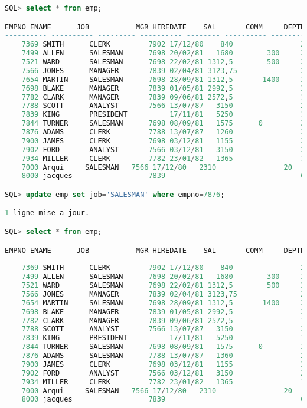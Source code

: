 \documentclass{article}
\begin{document}
\begin{lstlisting}[language=SQL,
    deletekeywords={char},
    morekeywords={DECLARE, LOOP, TYPE, FOR, IF, IS, OPEN, FETCH, DBMS_OUTPUT, PUT_LINE}]
SQL> select * from emp;

EMPNO ENAME      JOB	       MGR HIREDATE	   SAL	     COMM     DEPTNO
---------- ---------- --------- ---------- -------- ---------- ---------- ----------
    7369 SMITH      CLERK	      7902 17/12/80	   840			      20
    7499 ALLEN      SALESMAN	  7698 20/02/81	  1680	      300	  30
    7521 WARD       SALESMAN	  7698 22/02/81	1312,5	      500	  30
    7566 JONES      MANAGER	      7839 02/04/81 3123,75			      20
    7654 MARTIN     SALESMAN	  7698 28/09/81	1312,5	     1400	  30
    7698 BLAKE      MANAGER	      7839 01/05/81	2992,5			      30
    7782 CLARK      MANAGER	      7839 09/06/81	2572,5			      10
    7788 SCOTT      ANALYST	      7566 13/07/87	  3150			      20
    7839 KING       PRESIDENT 	       17/11/81	  5250			      10
    7844 TURNER     SALESMAN	  7698 08/09/81	  1575		0	      30
    7876 ADAMS      CLERK	      7788 13/07/87	  1260			      20
    7900 JAMES      CLERK	      7698 03/12/81	  1155			      30
    7902 FORD       ANALYST	      7566 03/12/81	  3150			      20
    7934 MILLER     CLERK	      7782 23/01/82	  1365			      10
    7000 Arqui     SALESMAN	  7566 17/12/80	  2310			      20
    8000 jacques		          7839					              64

SQL> update emp set job='SALESMAN' where empno=7876;

1 ligne mise a jour.

SQL> select * from emp;

EMPNO ENAME      JOB	       MGR HIREDATE	   SAL	     COMM     DEPTNO
---------- ---------- --------- ---------- -------- ---------- ---------- ----------
    7369 SMITH      CLERK	      7902 17/12/80	   840			      20
    7499 ALLEN      SALESMAN	  7698 20/02/81	  1680	      300	  30
    7521 WARD       SALESMAN	  7698 22/02/81	1312,5	      500	  30
    7566 JONES      MANAGER	      7839 02/04/81 3123,75			      20
    7654 MARTIN     SALESMAN	  7698 28/09/81	1312,5	     1400	  30
    7698 BLAKE      MANAGER	      7839 01/05/81	2992,5			      30
    7782 CLARK      MANAGER	      7839 09/06/81	2572,5			      10
    7788 SCOTT      ANALYST	      7566 13/07/87	  3150			      20
    7839 KING       PRESIDENT 	       17/11/81	  5250			      10
    7844 TURNER     SALESMAN	  7698 08/09/81	  1575		0	      30
    7876 ADAMS      SALESMAN	  7788 13/07/87	  1360			      20
    7900 JAMES      CLERK	      7698 03/12/81	  1155			      30
    7902 FORD       ANALYST	      7566 03/12/81	  3150			      20
    7934 MILLER     CLERK	      7782 23/01/82	  1365			      10
    7000 Arqui     SALESMAN	  7566 17/12/80	  2310			      20
    8000 jacques		          7839					              64


\end{lstlisting}
\end{document}
